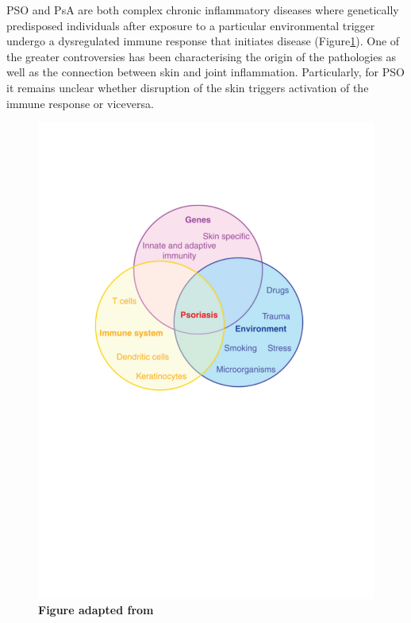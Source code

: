 PSO and PsA are both complex chronic inflammatory diseases where genetically predisposed individuals after exposure to a particular environmental trigger undergo a dysregulated immune response that initiates disease (Figure\ref{fig:PSO_aetiology_diagram}). One of the greater controversies has been characterising the origin of the pathologies as well as the connection between skin and joint inflammation. Particularly, for PSO it remains unclear whether disruption of the skin triggers activation of the immune response or viceversa.

\begin{figure}[H]
\includegraphics[width=\textwidth]{./Introduction/pdfs/PSO_aetiology_diagram_Di_Meglio_et_al_2014.pdf}
\caption[Main factors involved in PSO disease aetiology]{\textbf{Figure adapted from \parencite{Meglio2014}}}
\label{fig:PSO_aetiology_diagram}
\end{figure}



